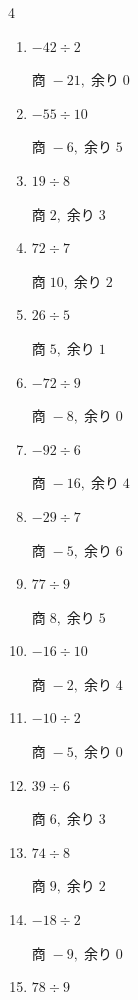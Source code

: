 \begin{multicols}{4}
\begin{enumerate}
        $商\; -11,\; 余り\; 1$

  \item $-42 \div 2$

        $商\; -21,\; 余り\; 0$

  \item $-55 \div 10$

        $商\; -6,\; 余り\; 5$

  \item $19 \div 8$

        $商\; 2,\; 余り\; 3$

  \item $72 \div 7$

        $商\; 10,\; 余り\; 2$

  \item $26 \div 5$

        $商\; 5,\; 余り\; 1$

  \item $-72 \div 9$

        $商\; -8,\; 余り\; 0$

  \item $-92 \div 6$

        $商\; -16,\; 余り\; 4$

  \item $-29 \div 7$

        $商\; -5,\; 余り\; 6$

  \item $77 \div 9$

        $商\; 8,\; 余り\; 5$

  \item $-16 \div 10$

        $商\; -2,\; 余り\; 4$

\columnbreak %

  \item $-10 \div 2$

        $商\; -5,\; 余り\; 0$

  \item $39 \div 6$

        $商\; 6,\; 余り\; 3$

  \item $74 \div 8$

        $商\; 9,\; 余り\; 2$

  \item $-18 \div 2$

        $商\; -9,\; 余り\; 0$

  \item $78 \div 9$


\end{enumerate}
\end{multicols}
